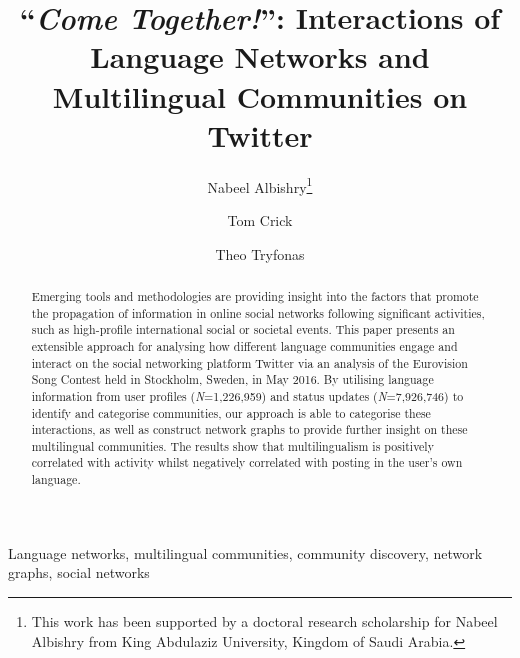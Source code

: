 \documentclass{llncs}
\begin{document}
\title{``{\emph{Come Together!}}'': Interactions of Language Networks and Multilingual Communities on Twitter}

\author{Nabeel Albishry\thanks{This work has been supported by a doctoral research scholarship for
Nabeel Albishry from King Abdulaziz University, Kingdom of Saudi
Arabia.} \and Tom
  Crick \and Theo Tryfonas}



\maketitle

\begin{abstract}
Emerging tools and methodologies are providing insight into the
factors that promote the propagation of information in online social
networks following significant activities, such as high-profile
international social or societal events. This paper presents an
extensible approach for analysing how different language communities
engage and interact on the social networking platform Twitter via an
analysis of the Eurovision Song Contest held in Stockholm, Sweden, in
May 2016.  By utilising language information from user profiles
({\emph{N}}=1,226,959) and status updates ({\emph{N}}=7,926,746) to
identify and categorise communities, our approach is able to
categorise these interactions, as well as construct network graphs to
provide further insight on these multilingual communities.  The
results show that multilingualism is positively correlated with
activity whilst negatively correlated with posting in the user's own
language.
 \end{abstract}

\begin{keywords}
Language networks, multilingual communities, community discovery,
network graphs, social networks
\end{keywords}
\end{document}
